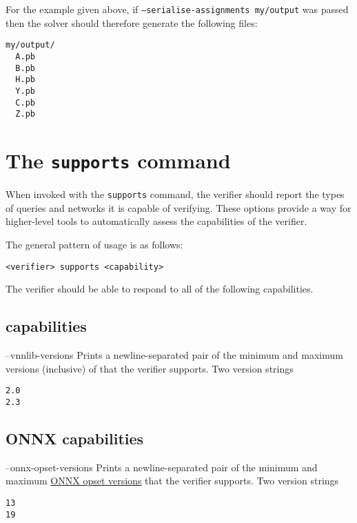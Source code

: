 For the example given above, if \texttt{--serialise-assignments my/output} was passed then the solver should therefore generate the following files:
\begin{lstlisting}[style=bash]
my/output/
  A.pb
  B.pb
  H.pb
  Y.pb
  C.pb
  Z.pb
\end{lstlisting}

\section{The \texttt{supports} command}
\label{sec:global_capabilities}

When invoked with the \texttt{supports} command, the verifier should report the types of queries and networks it is capable of verifying.
These options provide a way for higher-level tools to automatically assess the capabilities of the verifier.

The general pattern of usage is as follows:
\begin{lstlisting}[style=bash]
<verifier> supports <capability>
\end{lstlisting}
The verifier should be able to respond to all of the following capabilities.

\subsection{\vnnlib{} capabilities}

\clOutputOption
{--vnnlib-versions}
{Prints a newline-separated pair of the minimum and maximum versions (inclusive) of \vnnlib{} that the verifier supports.}
{Two version strings}
\begin{lstlisting}[style=bash]
%*\exampleVerifier* supports --vnnlib-versions
2.0
2.3
\end{lstlisting}

\subsection{ONNX capabilities}

\clOutputOption
{--onnx-opset-versions}
{Prints a newline-separated pair of the minimum and maximum \href{https://onnxruntime.ai/docs/reference/compatibility.html\#onnx-opset-support}{ONNX opset versions} that the verifier supports.}
{Two version strings}
\begin{lstlisting}[style=bash]
%*\exampleVerifier* supports --onnx-opset-versions
13
19
\end{lstlisting}

